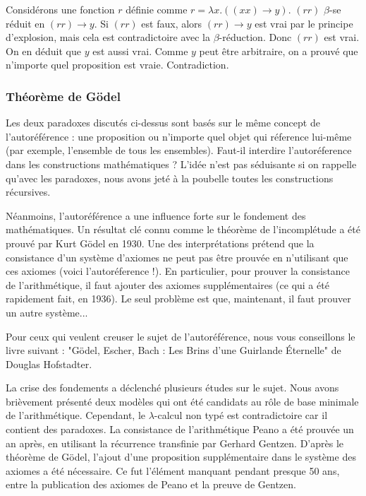 \documentclass[12pt, a4paper]{article}
\begin{document}
{\footnotesize
	Considérons une fonction $r$ définie comme $r=\lambda x.((x x) \to y)$.
	$(r r)$ $\beta$-se réduit en $(r r) \to y$.
	Si $(r r)$ est faux, alors $(r r) \to y$ est vrai par le principe d'explosion, mais cela est contradictoire avec la $\beta$-réduction.
	Donc $(r r)$ est vrai.
	On en déduit que $y$ est aussi vrai.
	Comme $y$ peut être arbitraire, on a prouvé que n'importe quel proposition est vraie.
	Contradiction.
}

\subsubsection*{Théorème de Gödel}
Les deux paradoxes discutés ci-dessus sont basés sur le même concept de l'autoréférence : une proposition ou n'importe quel objet qui réference lui-même (par exemple, l'ensemble de tous les ensembles).
Faut-il interdire l'autoréference dans les constructions mathématiques ?
L'idée n'est pas séduisante si on rappelle qu'avec les paradoxes, nous avons jeté à la poubelle toutes les constructions récursives.

Néanmoins, l'autoréférence a une influence forte sur le fondement des mathématiques.
Un résultat clé connu comme le théorème de l'incomplétude a été prouvé par Kurt Gödel en 1930.
Une des interprétations prétend que la consistance d'un système d'axiomes ne peut pas être prouvée en n'utilisant que ces axiomes (voici l'autoréference !). En particulier, pour prouver la consistance de l'arithmétique, il faut ajouter des axiomes supplémentaires (ce qui a été rapidement fait, en 1936). Le seul problème est que, maintenant, il faut prouver un autre système...

{\footnotesize
	Pour ceux qui veulent creuser le sujet de l'autoréférence, nous vous conseillons le livre suivant : "Gödel, Escher, Bach : Les Brins d'une Guirlande Éternelle" de Douglas Hofstadter.
}

La crise des fondements a déclenché plusieurs études sur le sujet.
Nous avons brièvement présenté deux modèles qui ont été candidats au rôle de base minimale de l'arithmétique.
Cependant, le $\lambda$-calcul non typé est contradictoire car il contient des paradoxes.
La consistance de l'arithmétique Peano a été prouvée un an après, en utilisant la récurrence transfinie par Gerhard Gentzen.
D'après le théorème de Gödel, l'ajout d'une proposition supplémentaire dans le système des axiomes a été nécessaire.
Ce fut l'élément manquant pendant presque 50 ans, entre la publication des axiomes de Peano et la preuve de Gentzen.
\end{document}
